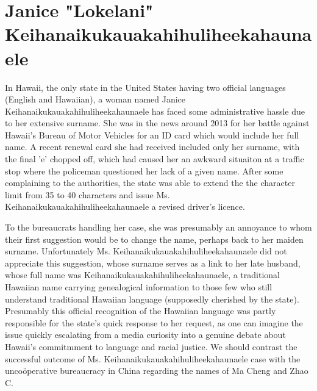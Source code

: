 \section{Janice "Lokelani" Keihanaikukauakahihuliheekahaunaele}

In Hawaii, the only state in the United States having two official languages
(English and Hawaiian), a woman named Janice Keihanaikukauakahihuliheekahaunaele
has faced some administrative hassle due to her extensive surname. She was in
the news around 2013 for her battle against Hawaii's Bureau of Motor Vehicles
for an ID card which would include her full name. A recent renewal card she had
received included only her surname, with the final 'e' chopped off, which had
caused her an awkward situaiton at a traffic stop where the policeman questioned
her lack of a given name. After some complaining to the authorities, the state
was able to extend the the character limit from 35 to 40 characters and issue
Ms. Keihanaikukauakahihuliheekahaunaele a revised driver's licence.

To the bureaucrats handling her case, she was presumably an annoyance to whom
their first suggestion would be to change the name, perhaps back to her maiden
surname. Unfortunately Ms. Keihanaikukauakahihuliheekahaunaele did not
appreciate this suggestion, whose surname serves as a link to her late husband,
whose full name was Keihanaikukauakahihuliheekahaunaele, a traditional Hawaiian
name carrying genealogical information to those few who still understand
traditional Hawaiian language (supposedly cherished by the state). Presumably
this official recognition of the Hawaiian language was partly responsible for
the state's quick response to her request, as one can imagine the issue quickly
escalating from a media curiosity into a genuine debate about Hawaii's
commitmment to language and racial justice. We should contrast the successful
outcome of Ms. Keihanaikukauakahihuliheekahaunaele case with the uncoöperative
bureaucracy in China regarding the names of Ma Cheng and Zhao C. 
